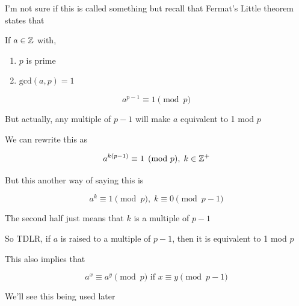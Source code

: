 \documentclass[../../Main.tex]{subfiles}
\begin{document}
\begin{definition}
    I'm not sure if this is called something but recall that Fermat's Little theorem states that

    If $a \in \mathbb{Z}$ with, 
    
    \begin{enumerate}
        \item $p$ is prime
        \item $\text{gcd}(a, p) = 1$
    \end{enumerate}
 
    $$a^{p - 1} \equiv 1 \pmod{p}$$

    But actually, any multiple of $p - 1$ will make $a$ equivalent to 1 mod $p$

    We can rewrite this as

    $$a^{k(p - 1)} \equiv 1 \pmod{p}, \; k \in \mathbb{Z}^+$$

    But this another way of saying this is

    $$\boxed{a^k \equiv 1 \pmod{p}, \; k \equiv 0 \pmod{p - 1}}$$

    The second half just means that $k$ is a multiple of $p - 1$

    So TDLR, if $a$ is raised to a multiple of $p - 1$, then it is equivalent to 1 mod $p$

    This also implies that

    $$a^x \equiv a^y \pmod{p} \text{ if } x \equiv y \pmod{p - 1}$$

    We'll see this being used later

\end{definition}
\end{document}
